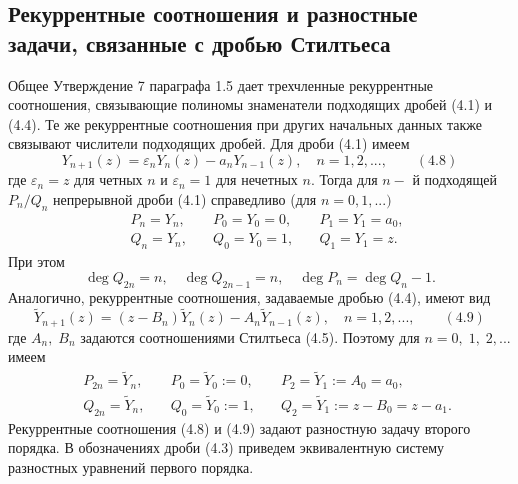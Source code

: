 \documentclass[12 pt, a4 paper]{article}
\theoremstyle{plain}   \newtheorem{Pro}{Задача}
\begin{document}
\subsection{Рекуррентные соотношения и разностные\\
задачи, связанные с дробью Стилтьеса}
Общее Утверждение 7 параграфа 1.5 дает трехчленные рекуррентные
соотношения, связывающие полиномы знаменатели подходящих
дробей (4.1) и (4.4). Те же рекуррентные соотношения при других
начальных данных также связывают числители подходящих дробей.
Для дроби (4.1) имеем
\begin{equation*}
  Y_{n+1}(z)=\varepsilon _n Y_n (z)-a_n Y_{n-1}(z),
  \quad n=1,2,..., \qquad (4.8)
\end{equation*}
где
$ \varepsilon _n =z $
для четных
$ n $
и
$ \varepsilon _n =1 $
для нечетных
$ n . $
Тогда для
$ n- $
й подходящей
$ P_n /Q_n $
непрерывной дроби (4.1) справедливо (для
$ n=0,1,...) $
\begin{align*}
  \; & P_n =Y_n , \quad & P_0 =Y_0 =0, \quad & P_1 =Y_1 =a_0 , \\
  \; & Q_n =Y_n , \quad & Q_0 =Y_0 =1, \quad & Q_1 =Y_1 =z .
\end{align*}
При этом
\begin{equation*}
  \deg Q_{2n}=n, \quad \deg Q_{2n-1}=n, \quad
  \deg P_n = \deg Q_n -1.
\end{equation*}
Аналогично, рекуррентные соотношения, задаваемые дробью
(4.4), имеют вид
\begin{equation*}
  \tilde Y_{n+1}(z)=(z-B_n )\tilde Y_n (z)-A_n \tilde Y_{n-1}(z),
  \quad n=1,2,..., \qquad (4.9)
\end{equation*}
где
$ A_n , \; B_n $
задаются соотношениями Стилтьеса (4.5).
Поэтому для
$ n=0, \; 1, \; 2,... $
имеем
\begin{align*}
  \; & P_{2n}=\tilde Y_n , \quad & P_0 =\tilde Y_0 :=0,
  \quad &  P_2 =\tilde Y_1 :=A_0 =a_0,\\
  \; & Q_{2n}=\tilde Y_n , \quad & Q_0 =\tilde Y_0 :=1,
  \quad & Q_2 =\tilde Y_1 :=z-B_0 =z-a_1 .
\end{align*}
Рекуррентные соотношения (4.8) и (4.9) задают разностную задачу
второго порядка. В обозначениях дроби (4.3) приведем эквивалентную
систему разностных уравнений первого порядка.
\end{document}
